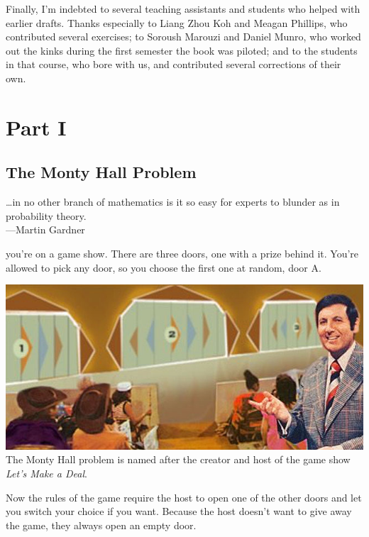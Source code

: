 \documentclass[justified]{tufte-book}
\newenvironment{epigraph}%
{
\begin{flushright}    
\begin{minipage}{20em}
\begin{flushright}
\itshape
}%
{
\end{flushright}
\end{minipage}
\end{flushright}
}
\theoremstyle{definition}
\theoremstyle{definition}
\theoremstyle{definition}
\theoremstyle{remark}
\begin{document}
Finally, I'm indebted to several teaching assistants and students who helped with earlier drafts. Thanks especially to Liang Zhou Koh and Meagan Phillips, who contributed several exercises; to Soroush Marouzi and Daniel Munro, who worked out the kinks during the first semester the book was piloted; and to the students in that course, who bore with us, and contributed several corrections of their own.

\hypertarget{part-part-i}{%
\part*{Part I}\label{part-part-i}}

\hypertarget{the-monty-hall-problem}{%
\chapter{The Monty Hall Problem}\label{the-monty-hall-problem}}

\begin{epigraph}
\ldots{}in no other branch of mathematics is it so easy for experts to
blunder as in probability theory.\\
---Martin Gardner
\end{epigraph}

 you're on a game show. There are three doors, one with a prize behind it. You're allowed to pick any door, so you choose the first one at random, door A.

\begin{marginfigure}
\includegraphics{img/lets_make_a_deal.png} The Monty Hall problem is
named after the creator and host of the game show \emph{Let's Make a
Deal}.
\end{marginfigure}

Now the rules of the game require the host to open one of the other doors and let you switch your choice if you want. Because the host doesn't want to give away the game, they always open an empty door.
\end{document}
